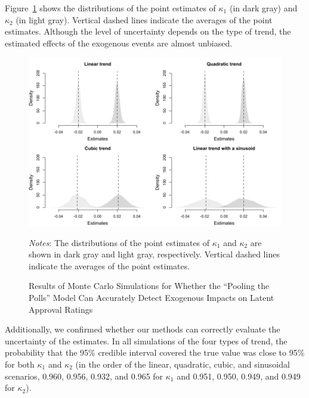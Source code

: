 \documentclass[12pt,letterpaper]{scrartcl}
\begin{document}
Figure~\ref{figure_simulation_2} shows the distributions of the point estimates of $\kappa _{1}$ (in dark gray) and $\kappa _{2}$ (in light gray). Vertical dashed lines indicate the averages of the point estimates. Although the level of uncertainty depends on the type of trend, the estimated effects of the exogenous events are almost unbiased.

\begin{figure}[t]
\begin{minipage}{\hsize}
\centering
\singlespacing
\includegraphics[scale=1]{Figure_JCR/AR1_simulation_2.pdf}
\caption{Results of Monte Carlo Simulations for Whether the ``Pooling the Polls'' Model Can Accurately Detect Exogenous Impacts on Latent Approval Ratings}
\label{figure_simulation_2}
\end{minipage}
\begin{minipage}{\hsize}
\bigskip
\small
\emph{Notes}: The distributions of the point estimates of $\kappa _{1}$ and $\kappa _{2}$ are shown in dark gray and light gray, respectively. Vertical dashed lines indicate the averages of the point estimates.
\bigskip
\end{minipage}
\end{figure}

Additionally, we confirmed whether our methods can correctly evaluate the uncertainty of the estimates. In all simulations of the four types of trend, the probability that the 95\% credible interval covered the true value was close to 95\% for both $\kappa _{1}$ and $\kappa _{2}$ (in the order of the linear, quadratic, cubic, and sinusoidal scenarios, 0.960, 0.956, 0.932, and 0.965 for $\kappa _{1}$ and 0.951, 0.950, 0.949, and 0.949 for $\kappa _{2}$).
\end{document}
